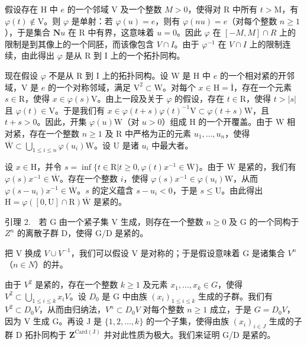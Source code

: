 假设存在 H 中 \(e\) 的一个邻域 V 及一个整数 \(M > 0\)，使得对 R 中所有 \(t > \mathrm{M}\)，有 \(\varphi(t) \notin \mathrm{V}\)。则 \(\varphi\) 是单射：若 \(\varphi(u) = e\)，则有 \(\varphi(nu) = e\)（对每个整数 \(n \geqslant 1\)），于是集合 \(\mathbf{N}u\) 在 R 中有界，这意味着 \(u = 0\)。因此 \(\varphi\) 在 \([-M, M] \cap R\) 上的限制是到其像上的一个同胚，而该像包含 \(V \cap I\)。由于 \(\varphi^{-1}\) 在 \(V \cap I\) 上的限制连续，由此得出 \(\varphi\) 是从 R 到 I 上的一个拓扑同构。

现在假设 \(\varphi\) 不是从 R 到 I 上的拓扑同构。设 W 是 H 中 \(e\) 的一个相对紧的开邻域，V 是 \(e\) 的一个对称邻域，满足 \(\mathrm{V}^2 \subset \mathrm{W}\)。对每个 \(x \in \mathrm{H} = \overline{\mathrm{I}}\)，存在一个元素 \(s \in \mathrm{R}\)，使得 \(x \in \varphi(s)\mathrm{V}\)。由上一段及关于 \(\varphi\) 的假设，存在 \(t \in \mathrm{R}\)，使得 \(t > |s|\) 且 \(\varphi(t) \in \mathrm{V}\)。于是我们有 \(x \in \varphi(t + s)\varphi(t)^{-1}\mathrm{V} \subset \varphi(t + s)\mathrm{W}\)，且 \(t + s > 0\)。因此，开集 \(\varphi(u)\mathrm{W}\)（对 \(u > 0\)）组成 H 的一个开覆盖。由于 W 相对紧，存在一个整数 \(n \geqslant 1\) 及 R 中严格为正的元素 \(u_1, \ldots, u_n\)，使得 \(\overline{\mathrm{W}} \subset \bigcup_{1 \leqslant i \leqslant n} \varphi(u_i)\mathrm{W}\)。设 U 是诸 \(u_i\) 中最大者。

设 \(x \in \mathrm{H}\)，并令 \(s = \inf \{t \in \mathrm{R} | t \geqslant 0, \varphi(t)x^{-1} \in \overline{\mathrm{W}}\}\)。由于 \(\overline{\mathrm{W}}\) 是紧的，我们有 \(\varphi(s)x^{-1} \in \overline{\mathrm{W}}\)。存在一个整数 \(i\)，使得 \(\varphi(s)x^{-1} \in \varphi(u_i)\mathrm{W}\)，从而 \(\varphi(s - u_i)x^{-1} \in \overline{\mathrm{W}}\)。\(s\) 的定义蕴含 \(s - u_i < 0\)，于是 \(s \leqslant \mathrm{U}\)。由此得出 \(\mathrm{H} = \varphi([0,\mathrm{U}] \cap \mathrm{R})\overline{\mathrm{W}}\) 是紧的。

引理 2.　若 G 由一个紧子集 V 生成，则存在一个整数 \(n \geqslant 0\) 及 G 的一个同构于 \(Z^{n}\) 的离散子群 D，使得 G/D 是紧的。

把 V 换成 \(V \cup V^{-1}\)，我们可以假设 V 是对称的；于是假设意味着 G 是诸集合 \(V^{n}\)（\(n \in N\)）的并。

由于 \(V^{2}\) 是紧的，存在一个整数 \(k \geqslant 1\) 及元素 \(x_{1}, \ldots, x_{k} \in G\)，使得 \(V^{2} \subset \bigcup_{1 \leqslant i \leqslant k} x_{i}V\)。设 \(D_{0}\) 是 G 中由族 \((x_{i})_{1 \leqslant i \leqslant k}\) 生成的子群。我们有 \(V^{2} \subset D_{0}V\)，从而由归纳法，\(V^{n} \subset D_{0}V\) 对每个整数 \(n \geqslant 1\) 成立，于是 \(G = D_{0}V\)，因为 V 生成 G。再设 J 是 \(\{1, 2, \ldots, k\}\) 的一个子集，使得由族 \((x_{i})_{i \in J}\) 生成的子群 D 拓扑同构于 \(\mathbf{Z}^{\mathrm{Card(J)}}\) 并对此性质为极大。我们来证明 G/D 是紧的。

